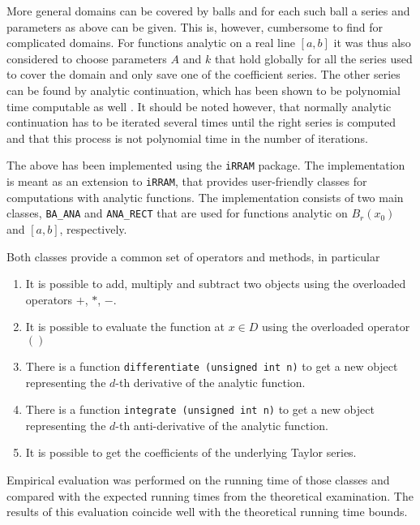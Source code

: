 \documentclass[]{article}
\newcommand{\code}{\texttt}
\newcommand{\irram}{\code{iRRAM}\xspace}
\newcommand{\baana}{\code{BA\_ANA}\xspace}
\newcommand{\anarect}{\code{ANA\_RECT}\xspace}
\begin{document}
More general domains can be covered by balls and for each such ball a series and parameters as above can be given. 
This is, however, cumbersome to find for complicated domains. 
For functions analytic on a real line $[a,b]$ it was thus also considered to choose parameters $A$ and $k$ that hold globally for all the series used to cover the domain and only save one of the coefficient series.
The other series can be found by analytic continuation, which has been shown to be polynomial time computable as well  \cite{Muller1993}. 
It should be noted however, that normally analytic continuation has to be iterated several times until the right series is computed and that this process is not polynomial time in the number of iterations.

The above has been implemented using the \irram package.
The implementation is meant as an extension to \irram, that
provides user-friendly classes for computations with analytic functions.
The implementation consists of two main classes, \baana and \anarect that are used for functions analytic on $B_r(x_0)$ 
and $[a,b]$, respectively.

Both classes provide a common set of operators and methods, in particular
\begin{enumerate}
  \item It is possible to add, multiply and subtract two objects using the overloaded operators $+$, $*$, $-$.
  \item It is possible to evaluate the function at $x \in D$ using the overloaded operator $()$
  \item There is a function \code{differentiate (unsigned int n)} to get a new object representing the $d$-th derivative of the analytic function.
  \item There is a function \code{integrate (unsigned int n)} to get a new object representing the $d$-th anti-derivative of the analytic function.
  \item It is possible to get the coefficients of the underlying Taylor series.
\end{enumerate}

Empirical evaluation was performed on the running time of those classes and compared
with the expected running times from the theoretical examination.
The results of this evaluation coincide well with the theoretical running time bounds.


\end{document}
